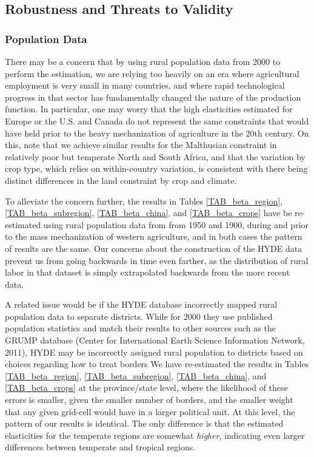 \documentclass[11pt]{article}
\begin{document}
\subsection{Robustness and Threats to Validity}
\subsubsection{Population Data} 
There may be a concern that by using rural population data from 2000 to perform the estimation, we are relying too heavily on an era where agricultural employment is very small in many countries, and where rapid technological progress in that sector has fundamentally changed the nature of the production function. In particular, one may worry that the high elasticities estimated for Europe or the U.S. and Canada do not represent the same constraints that would have held prior to the heavy mechanization of agriculture in the 20th century. On this, note that we achieve similar results for the Malthusian constraint in relatively poor but temperate North and South Africa, and that the variation by crop type, which relies on within-country variation, is consistent with there being distinct differences in the land constraint by crop and climate. 

To alleviate the concern further, the results in Tables \ref{TAB_beta_region}, \ref{TAB_beta_subregion}, \ref{TAB_beta_china}, and \ref{TAB_beta_crops} have be re-estimated using rural population data from \citet{hyde31} from 1950 and 1900, during and prior to the mass mechanization of western agriculture, and in both cases the pattern of results are the same. Our concerns about the construction of the HYDE data prevent us from going backwards in time even farther, as the distribution of rural labor in that dataset is simply extrapolated backwards from the more recent data.

A related issue would be if the HYDE database incorrectly mapped rural population data to separate districts. While for 2000 they use published population statistics and match their results to other sources such as the GRUMP database \nocite{GRUMP} (Center for International Earth Science Information Network, 2011), HYDE may be incorrectly assigned rural population to districts based on choices regarding how to treat borders We have re-estimated the results in Tables \ref{TAB_beta_region}, \ref{TAB_beta_subregion}, \ref{TAB_beta_china}, and \ref{TAB_beta_crops} at the province/state level, where the likelihood of these errors is smaller, given the smaller number of borders, and the smaller weight that any given grid-cell would have in a larger political unit. At this level, the pattern of our results is identical. The only difference is that the estimated elasticities for the temperate regions are somewhat \textit{higher}, indicating even larger differences between temperate and tropical regions.
\end{document}
